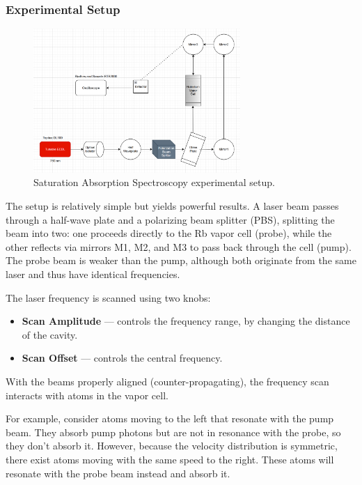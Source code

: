 \documentclass[a4paper, 12pt]{article}
\begin{document}
\subsubsection{Experimental Setup}
\begin{figure}[htbp]
    \centering
    \includegraphics[width=0.7\textwidth]{experimental-setup.png}
    \caption{Saturation Absorption Spectroscopy experimental setup.}
    \label{fig:label}
\end{figure}


The setup is relatively simple but yields powerful results. A laser beam passes through a half-wave plate and a polarizing beam splitter (PBS), splitting the beam into two: one proceeds directly to the Rb vapor cell (probe), while the other reflects via mirrors M1, M2, and M3 to pass back through the cell (pump). The probe beam is weaker than the pump, although both originate from the same laser and thus have identical frequencies.

The laser frequency is scanned using two knobs:
\begin{itemize}
    \item \textbf{Scan Amplitude} — controls the frequency range, by changing the distance of the cavity.
    \item \textbf{Scan Offset} — controls the central frequency.
\end{itemize}

With the beams properly aligned (counter-propagating), the frequency scan interacts with atoms in the vapor cell. 

For example, consider atoms moving to the left that resonate with the pump beam. They absorb pump photons but are not in resonance with the probe, so they don’t absorb it. However, because the velocity distribution is symmetric, there exist atoms moving with the same speed to the right. These atoms will resonate with the probe beam instead and absorb it.
\end{document}
